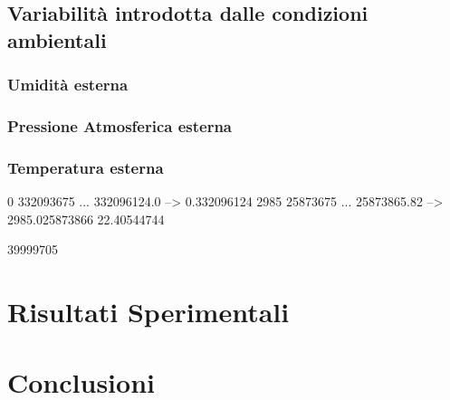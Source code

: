 \documentclass[8pt]{extarticle}
\begin{document}
\subsection{Variabilità introdotta dalle condizioni ambientali}

\subsubsection{Umidità esterna}

\subsubsection{Pressione Atmosferica esterna}

\subsubsection{Temperatura esterna}




0    332093675 ... 332096124.0  --> 0.332096124
2985 25873675  ... 25873865.82  --> 2985.025873866
22.40544744

39999705


\section{Risultati Sperimentali}
\section{Conclusioni}


\end{document}
